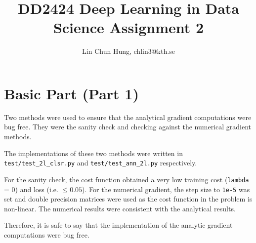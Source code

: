 \documentclass[12pt]{article}
\newenvironment{question}[2][Question]{\begin{trivlist}
\kern10pt
\item[\hskip \labelsep {\bfseries #1}\hskip \labelsep {\bfseries #2.}]}{\end{trivlist}}
\begin{document}
\title{DD2424 Deep Learning in Data Science Assignment 2}
\author{Lin Chun Hung, chlin3@kth.se}

\maketitle

\section{Basic Part (Part 1)}
\begin{question}{i}
Two methods were used to ensure that the analytical gradient computations were bug
free.
They were the sanity check and checking against the numerical gradient methods.

The implementations of these two methods were written in
\texttt{test/test\_2l\_clsr.py} and \texttt{test/test\_ann\_2l.py} respectively.

For the sanity check, the cost function obtained a very low training cost (\texttt{lambda} = 0)
and loss (i.e. $\leq 0.05$).
For the numerical gradient, the step size to \texttt{1e-5} was set and
double precision matrices were used as the cost function in the problem is non-linear.
The numerical results were consistent with the analytical results.

Therefore, it is safe to say that the implementation of the
analytic gradient computations were bug free.
\end{question}
\end{document}
